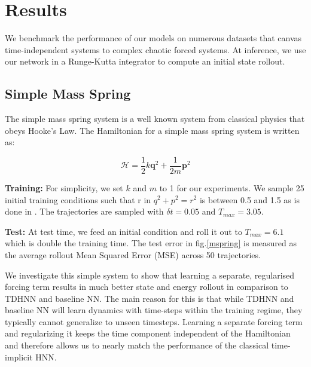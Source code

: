 \documentclass[twoside]{article}
\begin{document}
\section{Results}

We benchmark the performance of our models on numerous datasets that canvas time-independent systems to complex chaotic forced systems. At inference, we use our network in a Runge-Kutta integrator to compute an initial state rollout.

\subsection{Simple Mass Spring}

The simple mass spring system is a well known system from classical physics that obeys Hooke's Law. The Hamiltonian for a simple mass spring system is written as:

\begin{equation}
\mathcal{H} = \frac{1}{2}k\mathbf{q}^2 + \frac{1}{2m}\mathbf{p}^2 
\end{equation}

\textbf{Training:} For simplicity, we set $k$ and $m$ to 1 for our experiments. We sample 25 initial training conditions such that r in $q^2+p^2 = r^2$ is between 0.5 and 1.5 as is done in \cite{greydanus_hamiltonian_2019}. The trajectories are sampled with $\delta t =0.05$ and $T_{max} = 3.05$.  

\textbf{Test:} At test time, we feed an initial condition and roll it out to $T_{max}=6.1$ which is double the training time. The test error in fig.\ref{mspring} is measured as the average rollout Mean Squared Error (MSE) across 50 trajectories. 

We investigate this simple system to show that learning a separate, regularised forcing term results in much better state and energy rollout in comparison to TDHNN and baseline NN. The main reason for this is that while TDHNN and baseline NN will learn dynamics with time-steps within the training regime, they typically cannot generalize to unseen timesteps. Learning a separate forcing term and regularizing it keeps the time component independent of the Hamiltonian and therefore allows us to nearly match the performance of the classical time-implicit HNN.
\end{document}
